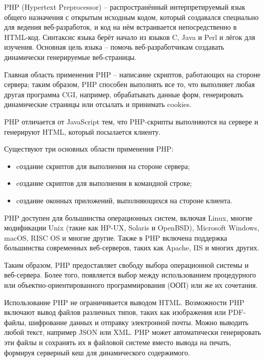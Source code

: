 PHP (Hypertext Preprocessor) -- распространённый интерпретируемый язык общего назначения с открытым исходным кодом, который создавался специально для ведения веб-разработок, и код на нём встраивается непосредственно в HTML-код. Синтаксис языка берёт начало из языков C, Java и Perl и лёгок для изучения. Основная цель языка -- помочь веб-разработчикам создавать динамически генерируемые веб-страницы. 

Главная область применения PHP -- написание скриптов, работающих на стороне сервера; таким образом, PHP способен выполнять все то, что выполняет любая другая программа CGI, например, обрабатывать данные форм, генерировать динамические страницы или отсылать и принимать cookies. 

PHP отличается от JavaScript тем, что PHP-скрипты выполняются на сервере и генерируют HTML, который посылается клиенту. 

Существуют три основных области применения PHP:
\begin{itemize}
	\item cоздание скриптов для выполнения на стороне сервера;
	\item cоздание скриптов для выполнения в командной строке;
	\item cоздание оконных приложений, выполняющихся на стороне клиента.
\end{itemize}

PHP доступен для большинства операционных систем, включая Linux, многие модификации Unix (такие как HP-UX, Solaris и OpenBSD), Microsoft Windows, macOS, RISC OS и многие другие. Также в PHP включена поддержка большинства современных веб-серверов, таких как Apache, IIS и многих других.

Таким образом, PHP предоставляет свободу выбора операционной системы и веб-сервера. Более того, появляется выбор между использованием процедурного или объектно-ориентированного программирования (ООП) или же их сочетания.

Использование PHP не ограничивается выводом HTML. Возможности PHP включают вывод файлов различных типов, таких как изображения или PDF-файлы, шифрование данных и отправку электронной почты. Можно выводить любой текст, например JSON или XML. PHP может автоматически генерировать эти файлы и сохранять их в файловой системе вместо вывода на печать, формируя серверный кеш для динамического содержимого.

